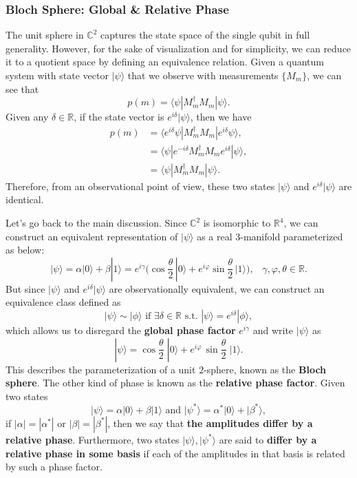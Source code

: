 \documentclass{article}
\theoremstyle{definition}
\begin{document}
\subsubsection*{Bloch Sphere: Global \& Relative Phase}
The unit sphere in $\mathbb{C}^2$ captures the state space of the single qubit in full generality. However, for the sake of visualization and for simplicity, we can reduce it to a quotient space by defining an equivalence relation. Given a quantum system with state vector $|\psi \rangle$ that we observe with measurements $\{M_m\}$, we can see that
\[p(m) = \langle \psi | M_m^\dagger M_m | \psi \rangle.\]
Given any $\delta \in \mathbb{R}$, if the state vector is $e^{i\delta} |\psi \rangle$, then we have
\begin{align*}
  p(m) & = \langle e^{i \delta} \psi | M_m^\dagger M_m | e^{i \delta} \psi \rangle, \\
  & = \langle \psi | e^{-i \delta} M_m^\dagger M_m e^{i \delta} | \psi \rangle, \\
  & = \langle \psi | M_m^\dagger M_m | \psi \rangle.
\end{align*}
Therefore, from an observational point of view, these two states $|\psi \rangle$ and $e^{i \delta} |\psi \rangle$ are identical.

Let's go back to the main discussion. Since $\mathbb{C}^2$ is isomorphic to $\mathbb{R}^4$, we can construct an equivalent representation of $|\psi \rangle$ as a real 3-manifold parameterized as below:
\[|\psi \rangle = \alpha |0 \rangle + \beta | 1 \rangle = e^{i \gamma} \bigg( \cos \frac{\theta}{2} \, |0 \rangle + e^{i \varphi} \sin \frac{\theta}{2} \, | 1\rangle \bigg), \;\;\; \gamma, \varphi, \theta \in \mathbb{R}.\]
But since $|\psi \rangle$ and $e^{i \delta} |\psi \rangle$ are observationally equivalent, we can construct an equivalence class defined as
\[|\psi\rangle \sim |\phi\rangle \text{ if } \exists \delta \in \mathbb{R} \text{ s.t. } |\psi \rangle = e^{i\delta} |\phi \rangle,\]
which allows us to disregard the \textbf{global phase factor} $e^{i \gamma}$ and write $|\psi \rangle$ as
\[|\psi \rangle = \cos \frac{\theta}{2} \; |0 \rangle + e^{i \varphi} \, \sin \frac{\theta}{2} \; |1 \rangle.\]
This describes the parameterization of a unit $2$-sphere, known as the \textbf{Bloch sphere}. The other kind of phase is known as the \textbf{relative phase factor}. Given two states
\[|\psi \rangle = \alpha |0\rangle + \beta |1\rangle \text{ and } |\psi^* \rangle = \alpha^* |0 \rangle + | \beta^* \rangle,\]
if $|\alpha| = |\alpha^*|$ or $|\beta| = |\beta^*|$, then we say that \textbf{the amplitudes differ by a relative phase}. Furthermore, two states $|\psi \rangle, |\psi^* \rangle$ are said to \textbf{differ by a relative phase in some basis} if each of the amplitudes in that basis is related by such a phase factor.
\end{document}
